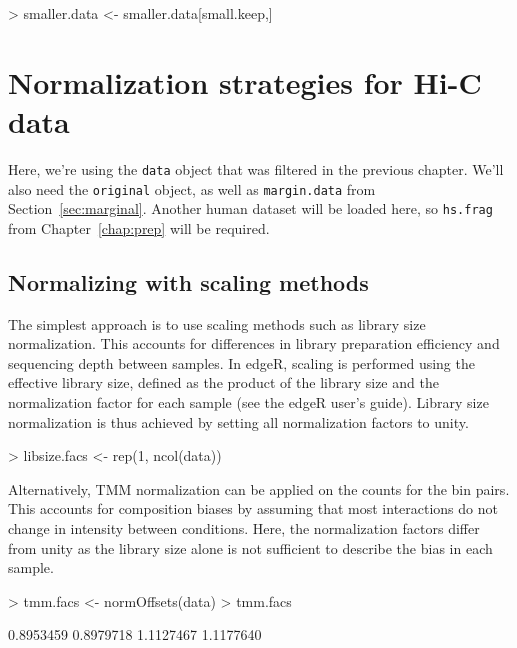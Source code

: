 \documentclass[12pt]{report}
\renewenvironment{Schunk}{\vspace{0pt}}{\vspace{0pt}}
\newcommand{\edgeR}{edgeR}
\newcommand{\code}[1]{{\small\texttt{#1}}}
\newenvironment{combox}
{ \begin{shaded}\begin{center}\begin{minipage}[t]{0.95\textwidth} }
{ \end{minipage}\end{center}\end{shaded} }
\begin{document}
\begin{Schunk}
\begin{Sinput}
> smaller.data <- smaller.data[small.keep,]
\end{Sinput}
\end{Schunk}

\chapter{Normalization strategies for Hi-C data}

\begin{combox}
Here, we're using the \code{data} object that was filtered in the previous chapter.
We'll also need the \code{original} object, as well as \code{margin.data} from Section~\ref{sec:marginal}.
Another human dataset will be loaded here, so \code{hs.frag} from Chapter~\ref{chap:prep} will be required.
\end{combox}

\section{Normalizing with scaling methods}
\label{sec:simplenorm}

The simplest approach is to use scaling methods such as library size normalization.
This accounts for differences in library preparation efficiency and sequencing depth between samples.
In \edgeR{}, scaling is performed using the effective library size, defined as the product of the library size and the normalization factor for each sample (see the \edgeR{} user's guide).
Library size normalization is thus achieved by setting all normalization factors to unity.

\begin{Schunk}
\begin{Sinput}
> libsize.facs <- rep(1, ncol(data))
\end{Sinput}
\end{Schunk}

Alternatively, TMM normalization \citep{oshlack2010tmm} can be applied on the counts for the bin pairs.
This accounts for composition biases by assuming that most interactions do not change in intensity between conditions.
Here, the normalization factors differ from unity as the library size alone is not sufficient to describe the bias in each sample.

\begin{Schunk}
\begin{Sinput}
> tmm.facs <- normOffsets(data)
> tmm.facs
\end{Sinput}
\begin{Soutput}
[1] 0.8953459 0.8979718 1.1127467 1.1177640
\end{Soutput}
\end{Schunk}
\end{document}
